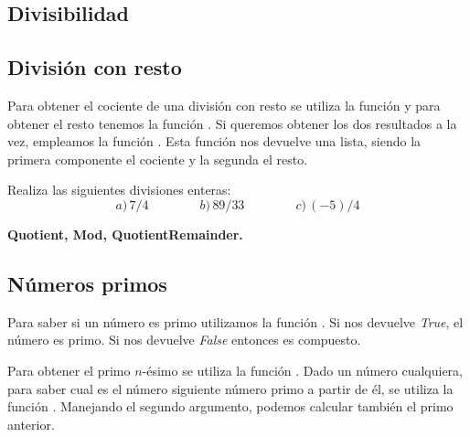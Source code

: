 \documentclass[a4paper,10pt, draft]{article}
\newcommand{\com}[1]{\textbf{\color{blue}{#1}}}
\newenvironment{capitulo}{\begin{tcolorbox}[colback=red!5!white,colframe=red!75!black]}{\end{tcolorbox}\bigskip}
\newenvironment{ejer}{\begin{tcolorbox}[center title, title=Ejercicios,
fonttitle=\sffamily\bfseries,colback=blue!5,colframe=orange]}{\end{tcolorbox}}
\newenvironment{funciones}{\begin{tcolorbox}[center title, title=Nuevas funciones, fonttitle=\sffamily\bfseries, colback=green!5!white,colframe=red!75!black]}{\end{tcolorbox}\bigskip}
\begin{document}
\newpage

\begin{capitulo}

\section{Divisibilidad}

\end{capitulo}



\subsection{División con resto}

Para obtener el cociente de una división con resto  se utiliza la función \com{Quotient[x,y]} y para obtener el resto tenemos la función \com{Mod[x,y]}. Si queremos obtener los dos resultados a la vez, empleamos la función \com{QuotientRemainder[x,y]}. Esta función nos devuelve una lista, siendo la primera componente el cociente y la segunda el resto.


\begin{ejer}

Realiza las siguientes divisiones enteras:
 $$
 a)\,7 / 4 \qquad \qquad b)\,89 /33\qquad \qquad  c)\,(-5) / 4
 $$
 
 \end{ejer}  
 
 
\begin{funciones}

\textbf{Quotient, Mod, QuotientRemainder.}


\end{funciones}
 
 
 \newpage
 
 \subsection{Números primos}

Para saber si un número es primo utilizamos la función \com{PrimeQ[x]}. Si nos devuelve \textit{True}, el número es primo. Si nos devuelve \textit{False} entonces es compuesto.

Para obtener el primo $n$-ésimo se utiliza la función \com{Prime[n]}. Dado un número cualquiera, para saber cual es el número siguiente número primo a partir de él, se utiliza la función \com{NextPrime[x,n]}. Manejando el segundo argumento, podemos calcular también el primo anterior.
\end{document}
